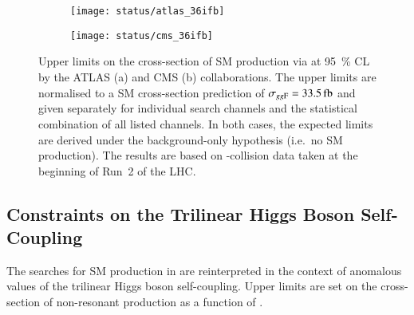 \begin{figure}[htbp]
  \centering

  \begin{subfigure}[b]{0.48\textwidth}
    \centering

    \texttt{[image: status/atlas\_36ifb]}

  \end{subfigure}\hfill%
  \begin{subfigure}[b]{0.48\textwidth}
    \centering

    \texttt{[image: status/cms\_36ifb]}

  \end{subfigure}

  \caption{Upper limits on the cross-section of SM \HH production via \ggF at
    \SI{95}{\percent} CL by the ATLAS (a) and CMS (b) collaborations. The upper
    limits are normalised to a SM cross-section prediction of
    $\sigma_{\ggF} = \SI{33.5}{\femto\barn}$ and given separately for individual
    search channels and the statistical combination of all listed channels. In
    both cases, the expected limits are derived under the background-only
    hypothesis (i.e.\ no SM \HH production). The results are based on
    \pp-collision data taken at the beginning of Run~2 of the LHC.}%
  \label{fig:prior_status_smhh}
\end{figure}


\subsection{Constraints on the Trilinear Higgs Boson Self-Coupling}%
\label{sec:past_results_klambda}

The searches for SM \HH production in  are
reinterpreted in the context of anomalous values of the trilinear Higgs boson
self-coupling. Upper limits are set on the cross-section of non-resonant \HH
production as a function of \klambda.

